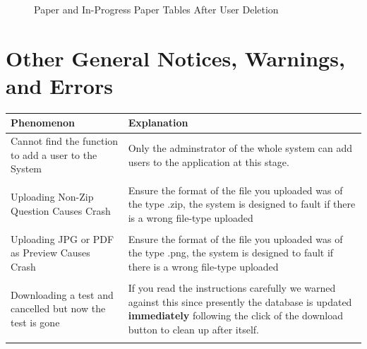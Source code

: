 \documentclass[12pt, a4paper, titlepage]{book}
\begin{document}
\begin{appendices}
\begin{figure}[H]
    \qquad
    \caption{Paper and In-Progress Paper Tables After User Deletion}
 \end{figure}

\chapter{Other General Notices, Warnings, and Errors}
\begin{table}[H]
\centering
\begin{tabular}{p{6cm} p{10 cm}}
\hline \hline
 Phenomenon & Explanation \\ \hline
 \normalsize 
 Cannot find the function to add a user to the System & Only the adminstrator of the whole system can add users to the application at this stage.\\\\
 Uploading Non-Zip Question Causes Crash & Ensure the format of the file you uploaded was of the type .zip, the system is designed to fault if there is a wrong file-type uploaded\\\\
 Uploading JPG or PDF as Preview Causes Crash & Ensure the format of the file you uploaded was of the type .png, the system is designed to fault if there is a wrong file-type uploaded\\\\
 Downloading a test and cancelled but now the test is gone & If you read the instructions carefully we warned against this since presently the database is updated \textbf{immediately }following the click of the download button to clean up after itself.\\\\
 \hline \hline
\end{tabular}
 \end{table}
\end{appendices}
\normalsize
\listoffigures
\end{document}
